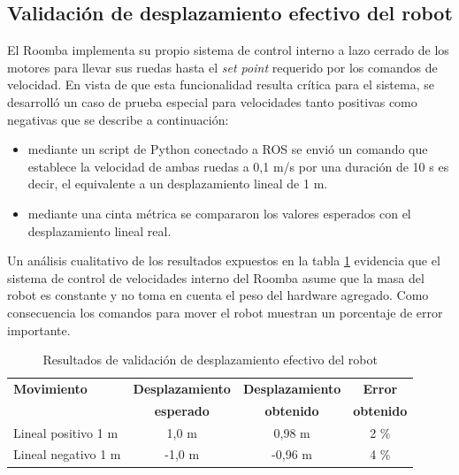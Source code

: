 \subsection{Validación de desplazamiento efectivo del robot}

El Roomba implementa su propio sistema de control interno a lazo cerrado de los motores para llevar sus ruedas hasta el \textit{set point} requerido por los comandos de velocidad. En vista de que esta funcionalidad resulta crítica para el sistema, se desarrolló un caso de prueba especial para velocidades tanto positivas como negativas que se describe a continuación:

\begin{itemize}
    \item mediante un script de Python conectado a ROS se envió un comando que establece la velocidad de ambas ruedas a 0,1 m/s por una duración de 10 s es decir, el equivalente a un desplazamiento lineal de 1 m.
    \item mediante una cinta métrica se compararon los valores esperados con el desplazamiento lineal real.
\end{itemize}

Un análisis cualitativo de los resultados expuestos en la tabla \ref{tab:desplazamientoRobot} evidencia que el sistema de control de velocidades interno del Roomba asume que la masa del robot es constante y no toma en cuenta el peso del hardware agregado. Como consecuencia los comandos para mover el robot muestran un porcentaje de error importante.

\begin{table}[!htbp]
    \centering
    \caption[Desplazamiento robot]{Resultados de validación de desplazamiento efectivo del robot}
    \begin{tabular}{lccc}
        \toprule
        \textbf{Movimiento} & \textbf{Desplazamiento} & \textbf{Desplazamiento} & \textbf{Error}    \\
                            & \textbf{esperado}       & \textbf{obtenido}       & \textbf{obtenido} \\
        \midrule
        Lineal positivo 1 m & 1,0 m                   & 0,98 m                  & 2 \%              \\
        Lineal negativo 1 m & -1,0 m                  & -0,96 m                 & 4 \%              \\
        \bottomrule
        \hline
    \end{tabular}
    \label{tab:desplazamientoRobot}
\end{table}

